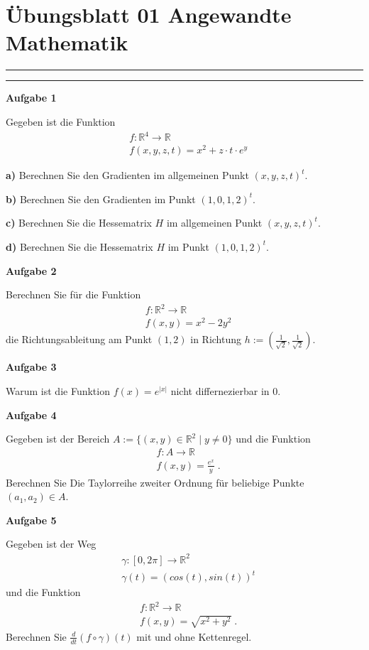 \documentclass[a4paper,13pt]{scrartcl}
\begin{document}
\section*{\large  Übungsblatt 01 \hfill Angewandte Mathematik }
\hrule
\hrule
\vspace{4mm}
{\bf Aufgabe 1}

Gegeben ist die Funktion 
\begin{align*}
& f : \mathbb{R}^4 \to \mathbb{R} \\
& f(x,y,z,t) = x^2 + z\cdot t \cdot e^y 
\end{align*}

{\bf a)}  Berechnen Sie den Gradienten im allgemeinen Punkt $(x,y,z,t)^t$.

{\bf b)}  Berechnen Sie den Gradienten im  Punkt $(1,0,1,2)^t$.

{\bf c)}  Berechnen Sie die Hessematrix $H$ im allgemeinen Punkt $(x,y,z,t)^t$.

{\bf d)}  Berechnen Sie die Hessematrix $H$ im  Punkt $(1,0,1,2)^t$.


\vspace{8mm}
{\bf Aufgabe 2}

Berechnen Sie für die Funktion 
\begin{align*}
& f : \mathbb{R}^2 \to \mathbb{R} \\
& f(x,y) = x^2  - 2y^2 
\end{align*}
die Richtungsableitung am Punkt $(1,2)$ in Richtung $h:= (\frac{1}{\sqrt{2}}, \frac{1}{\sqrt{2}})$.

\vspace{8mm}
{\bf Aufgabe 3}

Warum ist die Funktion $f(x) = e^{|x|}$ nicht differnezierbar in $0$.


\vspace{8mm}
{\bf Aufgabe 4}

Gegeben ist der Bereich $A:= \{ (x,y) \in \mathbb{R}^2 \; | \;  y \neq 0 \}$ und die Funktion
\begin{align*}
& f : A  \to \mathbb{R} \\
& f(x,y) = \frac{e^x}{y} \;.
\end{align*}
 Berechnen Sie Die Taylorreihe zweiter Ordnung für beliebige Punkte $(a_1, a_2) \in A$.

\vspace{8mm}
{\bf Aufgabe 5}

Gegeben ist der Weg 
\begin{align*}
& \gamma : [0, 2 \pi] \to \mathbb{R}^2 \\
& \gamma(t) = (cos(t), sin(t))^t
\end{align*}
und die Funktion 
\begin{align*}
& f : \mathbb{R}^2 \to\mathbb{R}  \\
& f(x,y) = \sqrt{x^2 + y^2} \;.
\end{align*}
Berechnen Sie $\frac{d}{dt} (f \circ \gamma) (t)$ mit und ohne  Kettenregel.
\end{document}
